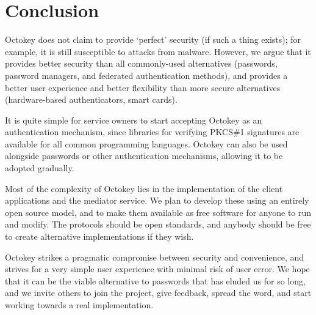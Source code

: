 %
%
%

\section{Conclusion}

Octokey does not claim to provide `perfect' security (if such a thing exists); for example, it is
still susceptible to attacks from malware. However, we argue that it provides better security than
all commonly-used alternatives (passwords, password managers, and federated authentication methods),
and provides a better user experience and better flexibility than more secure alternatives
(hardware-based authenticators, smart cards).

It is quite simple for service owners to start accepting Octokey as an authentication mechanism,
since libraries for verifying PKCS\#1 signatures are available for all common programming languages.
Octokey can also be used alongside passwords or other authentication mechanisms, allowing it to be
adopted gradually.

Most of the complexity of Octokey lies in the implementation of the client applications and the
mediator service. We plan to develop these using an entirely open source model, and to make them
available as free software for anyone to run and modify. The protocols should be open standards, and
anybody should be free to create alternative implementations if they wish.

Octokey strikes a pragmatic compromise between security and convenience, and strives for a very
simple user experience with minimal risk of user error. We hope that it can be the viable
alternative to passwords that has eluded us for so long, and we invite others to join the project,
give feedback, spread the word, and start working towards a real implementation.

